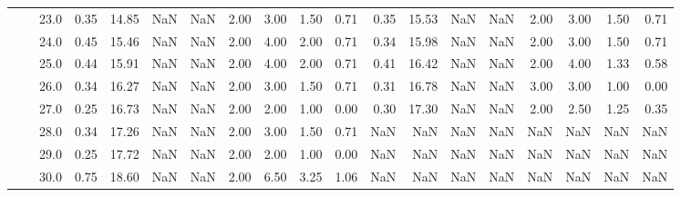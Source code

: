 \begin{tabular}{lllrrrrrrrrrrrrrrrr}
       &     & 23.0 &      0.35 &      14.85 &               NaN &                NaN & 2.00 &   3.00 &             1.50 &                         0.71 &      0.35 &      15.53 &               NaN &                NaN & 2.00 &   3.00 &             1.50 &                         0.71 \\
       &     & 24.0 &      0.45 &      15.46 &               NaN &                NaN & 2.00 &   4.00 &             2.00 &                         0.71 &      0.34 &      15.98 &               NaN &                NaN & 2.00 &   3.00 &             1.50 &                         0.71 \\
       &     & 25.0 &      0.44 &      15.91 &               NaN &                NaN & 2.00 &   4.00 &             2.00 &                         0.71 &      0.41 &      16.42 &               NaN &                NaN & 2.00 &   4.00 &             1.33 &                         0.58 \\
       &     & 26.0 &      0.34 &      16.27 &               NaN &                NaN & 2.00 &   3.00 &             1.50 &                         0.71 &      0.31 &      16.78 &               NaN &                NaN & 3.00 &   3.00 &             1.00 &                         0.00 \\
       &     & 27.0 &      0.25 &      16.73 &               NaN &                NaN & 2.00 &   2.00 &             1.00 &                         0.00 &      0.30 &      17.30 &               NaN &                NaN & 2.00 &   2.50 &             1.25 &                         0.35 \\
       &     & 28.0 &      0.34 &      17.26 &               NaN &                NaN & 2.00 &   3.00 &             1.50 &                         0.71 &       NaN &        NaN &               NaN &                NaN &  NaN &    NaN &              NaN &                          NaN \\
       &     & 29.0 &      0.25 &      17.72 &               NaN &                NaN & 2.00 &   2.00 &             1.00 &                         0.00 &       NaN &        NaN &               NaN &                NaN &  NaN &    NaN &              NaN &                          NaN \\
       &     & 30.0 &      0.75 &      18.60 &               NaN &                NaN & 2.00 &   6.50 &             3.25 &                         1.06 &       NaN &        NaN &               NaN &                NaN &  NaN &    NaN &              NaN &                          NaN \\

\end{tabular}
